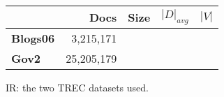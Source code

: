 \begin{figure}
\centering
{\small
\begin{tabular}{|l|r|r|r|r|}
    \hline & \textbf{Docs} & \textbf{Size} & \textbf{$|D|_{avg}$} &
    \textbf{$|V|$} \\
    \hline
    \textbf{Blogs06} & 3,215,171 & & & \\
    \textbf{Gov2} & 25,205,179 & & & \\
    \hline
\end{tabular}
}
\caption{IR: the two TREC datasets used.}
\label{fig:ir-datasets}
\end{figure}
